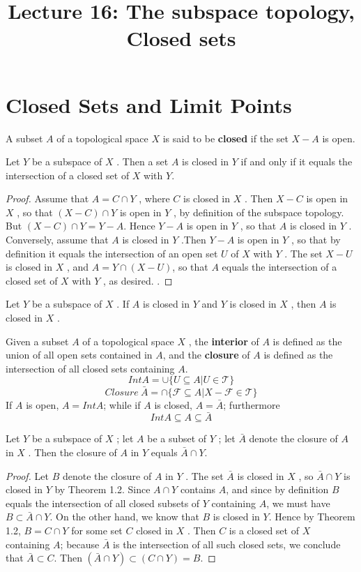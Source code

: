 \documentclass[a4paper,english,12pt]{article}
\title{Lecture 16: The subspace topology, Closed sets}
\author{}
\begin{document}
\maketitle

\section{Closed Sets and Limit Points}
\begin{defn}
A subset $A$ of a topological space $X$ is said to be \textbf{closed} if the set $X - A$ is open.
\end{defn}
\begin{thm}
Let $Y$ be a subspace of $X$ . Then a set $A$ is closed in $Y$ if and only if
it equals the intersection of a closed set of $X$ with $Y$.
\end{thm}
\begin{proof}
Assume that $A = C \cap Y$ , where $C$ is closed in $X$ . Then $X-C$ is open in $X$ , so that $(X - C) \cap Y$ is open in $Y$ , by definition of the subspace topology. But $(X - C) \cap Y = Y - A$. Hence $Y - A$ is open in $Y$ , so that $A$ is closed in $Y$ . Conversely, assume that $A$ is closed in $Y$ .Then $Y - A$ is open in $Y$ , so that by definition it equals the intersection of an open set $U$ of $X$ with $Y$ . The set $X - U$ is closed in $X$ , and $A = Y \cap (X - U )$, so that $A$ equals the intersection of a closed set of $X$ with $Y$ , as desired. .
\end{proof}
\begin{thm}
Let $Y$ be a subspace of $X$ . If $A$ is closed in $Y$ and $Y$ is closed in $X$ ,
then $A$ is closed in $X$ .
\end{thm}
\begin{defn}
Given a subset $A$ of a topological space $X$ , the \textbf{interior} of $A$ is defined as the union of all open sets contained in $A$, and the \textbf{closure} of $A$ is defined as the intersection of all closed sets containing $A$.
\[ Int A =\cup\{U\subseteq A | U\in \mathcal{T}  \}\]
\[Closure \  \bar{A}= \cap \{\mathcal{F} \subseteq A | X - \mathcal{F} \in \mathcal{T}\}
\]
If $A$ is open, $A = Int A$; while if $A$ is closed, $A = \bar{A}$; furthermore
\[ IntA \subseteq A \subseteq \bar{A}
\]
\end{defn}
\begin{thm}
Let $Y$ be a subspace of $X$ ; let $A$ be a subset of $Y$ ; let $\bar{A}$ denote the
closure of $A$ in $X$ . Then the closure of $A$ in $Y$ equals $\bar{A} \cap Y$.
\begin{proof}
Let $B$ denote the closure of $A$ in $Y$ . The set $\bar{A}$ is closed in $X$ , so $\bar{A} \cap Y$ is closed in $Y$ by Theorem 1.2. Since $A \cap Y$ contains $A$, and since by definition $B$ equals the intersection of all closed subsets of $Y$ containing $A$, we must have $B \subset \bar{A} \cap Y$. On the other hand, we know that $B$ is closed in $Y$. Hence by Theorem 1.2, $B = C \cap Y$ for some set $C$ closed in $X$ . Then $C$ is a closed set of $X$ containing $A$; because $\bar{A}$ is the intersection of all such closed sets, we conclude that $\bar{A} \subset C$. Then $(\bar{A} \cap Y ) \subset (C \cap Y ) = B$.
\end{proof}
\end{thm}
\end{document}
